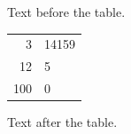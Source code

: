 \documentclass[12pt]{article}
\begin{document}
Text before the table.

\begin{tabular}{r@{.}l}3&14159\\12&5\\100&0\end{tabular}

Text after the table.
\end{document}
